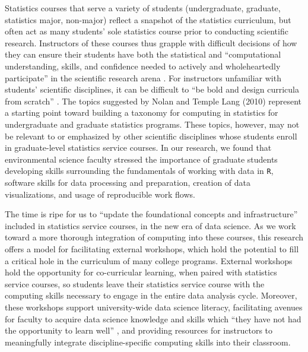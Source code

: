 \documentclass[12pt]{article}
\begin{document}
\quad Statistics courses that serve a variety of students (undergraduate,
graduate, statistics major, non-major) reflect a snapshot of the statistics
curriculum, but often act as many students' sole statistics course prior to
conducting scientific research. Instructors of these courses thus grapple with 
difficult decisions of how they can ensure their students have both the
statistical and ``computational understanding, skills, and confidence needed to
actively and wholeheartedly participate'' in the scientific research arena 
\citep[p.\ 106]{nolan}. For instructors unfamiliar with students' scientific
disciplines, it can be difficult to ``be bold and design curricula from
scratch'' \citep[p.\ 106]{nolan}. The topics suggested by Nolan and Temple Lang
(2010) represent a starting point toward building a taxonomy for computing in
statistics for undergraduate and graduate statistics programs. These topics,
however, may not be relevant to or emphasized by other scientific disciplines
whose students enroll in graduate-level statistics service courses.  In our
research, we found that environmental science faculty stressed the importance of
graduate students developing skills surrounding the fundamentals of working with
data in \texttt{R}, software skills for data processing and preparation, 
creation of data visualizations, and usage of reproducible work flows. 

\quad The time is ripe for us to ``update the foundational concepts and
infrastructure'' \citep[p.\ 5]{crossroads} included in statistics service
courses, in the new era of data science. As we work toward a more thorough
integration of computing into these courses, this research offers a model for
facilitating external workshops, which hold the potential to fill a critical
hole in the curriculum of many college programs. External workshops hold the
opportunity for co-curricular learning, when paired with statistics service
courses, so students leave their statistics service course with the computing
skills necessary to engage in the entire data analysis cycle. Moreover, these
workshops support university-wide data science literacy, facilitating avenues
for faculty to acquire data science knowledge and skills which ``they have not
had the opportunity to learn well'' \citep[p.\ 106]{nolan}, and providing
resources for instructors to meaningfully integrate discipline-specific
computing skills into their classroom. 

\end{document}
